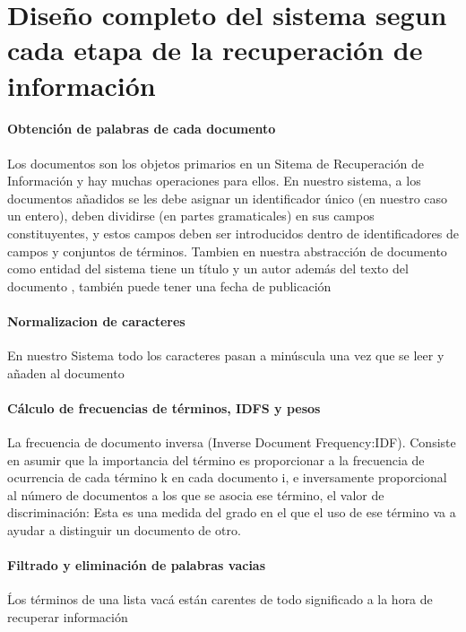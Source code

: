 \documentclass{llncs}
\begin{document}
 
\newpage


\section{Dise\~no completo del sistema segun cada etapa de la recuperaci\'on de informaci\'on}

\paragraph{Obtenci\'on de palabras de cada documento}


Los documentos son los objetos primarios en un Sitema de Recuperaci\'on de Informaci\'on y hay muchas operaciones para ellos. En nuestro sistema, a los documentos añadidos  se les debe asignar un identificador \'unico (en nuestro caso un entero), deben dividirse (en partes gramaticales) en sus campos constituyentes, y estos campos deben ser introducidos dentro de identificadores de campos y conjuntos de términos. Tambien en nuestra abstracci\'on de documento como entidad del sistema tiene un t\'itulo y un autor adem\'as del texto del documento , tambi\'en puede tener una fecha de publicaci\'on

 
\paragraph{Normalizacion de caracteres} 
En nuestro Sistema todo los caracteres pasan a min\'uscula una vez que se leer y a\~naden al documento 


\paragraph{C\'alculo de frecuencias de t\'erminos, IDFS y pesos} 

La frecuencia de documento inversa (Inverse Document Frequency:IDF). Consiste en asumir que la importancia del término es proporcionar a la frecuencia de ocurrencia de cada término k en cada documento i, e inversamente proporcional al n\'umero de documentos a los que se asocia ese t\'ermino, el valor de discriminación: Esta es una medida del grado en el que el uso de ese t\'ermino va a ayudar a distinguir un documento de otro. 

\paragraph{Filtrado y eliminaci\'on de palabras vacias}
\'Los t\'erminos de una lista vac\'a están carentes de todo significado a la hora de recuperar informaci\'on 
\end{document}
